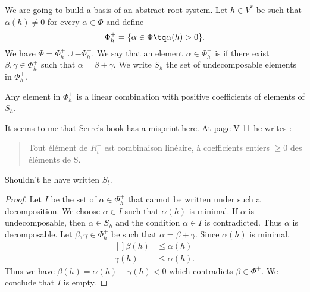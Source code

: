 We are going to build a basis of an abstract root system. Let \( h\in V^*\) be such that \( \alpha(h)\neq 0\) for every  \( \alpha\in\Phi\) and define
\begin{equation}
    \Phi_h^+=\{ \alpha\in\Phi\tq \alpha(h)>0 \}.
\end{equation}
We have \( \Phi=\Phi^+_h\cup -\Phi_h^+\). We say that an element \( \alpha\in\Phi^+_h\) is  if there exist \( \beta,\gamma\in\Phi_h^+\) such that \( \alpha=\beta+\gamma\). We write \( S_h\) the set of undecomposable elements in \( \Phi^+_h\).

\begin{lemma}       \label{LemShPhihpCBLSh}
    Any element in \( \Phi^+_h\) is a linear combination with positive coefficients of elements of \( S_h\).
\end{lemma}

\begin{probleme}
    It seems to me that Serre's book\cite{SerreSSAlgebres} has a misprint here. At page V-11 he writes :
    \begin{quote}
        Tout élément de \( R^+_t\) est combinaison linéaire, à coefficients entiers \( \geq 0\) des éléments de S.
    \end{quote}
    Shouldn't he have written \( S_t\).
\end{probleme}

\begin{proof}
    Let \( I\) be the set of \( \alpha\in\Phi^+_h\) that cannot be written under such a decomposition. We choose \( \alpha\in I\) such that \( \alpha(h)\) is minimal. If \( \alpha\) is undecomposable, then \( \alpha\in S_h\) and the condition \( \alpha\in I\) is contradicted. Thus \( \alpha\) is decomposable. Let \( \beta,\gamma\in\Phi^+_h\) be such that \( \alpha=\beta+\gamma\). Since \( \alpha(h)\) is minimal,
    \begin{equation}
        \begin{aligned}[]
            \beta(h)&\leq \alpha(h)\\
            \gamma(h)&\leq \alpha(h).
        \end{aligned}
    \end{equation}
    Thus we have \( \beta(h)=\alpha(h)-\gamma(h)<0\) which contradicts \( \beta\in\Phi^+\). We conclude that \( I\) is empty.
\end{proof}

